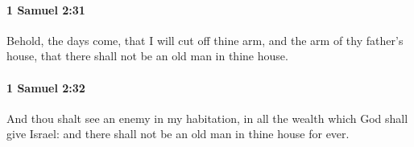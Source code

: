 		\paragraph{1 Samuel 2:31} %
			\label{1SAMUEL-2-31}

			Behold, the days come, that I will cut off thine arm, and the arm of thy father’s house, that there shall not be an old man in thine house.


		\paragraph{1 Samuel 2:32} %
			\label{1SAMUEL-2-32}

			And thou shalt see an enemy in my habitation, in all the wealth which God shall give Israel: and there shall not be an old man in thine house for ever.


